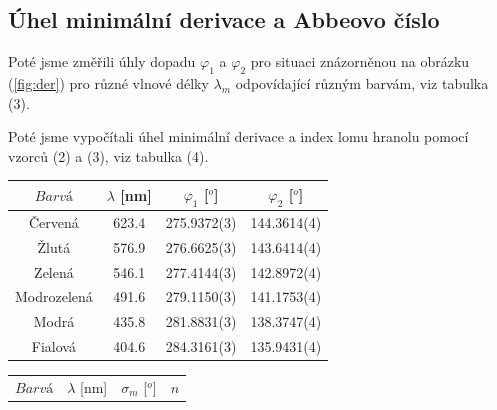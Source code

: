 \documentclass[a4paper,11pt]{article}
\begin{document}
\begin{minipage}[t]{0.5\textwidth}
            \subsection{Úhel minimální derivace a Abbeovo číslo}
                Poté jsme změřili úhly dopadu $\varphi_1$ a $\varphi_2$ pro situaci znázorněnou na obrázku (\ref{fig:der}) pro různé vlnové délky $\lambda_m$ odpovídající různým barvám, viz tabulka (3). 
    \end{minipage}
    \hspace{10pt}
    \begin{minipage}[t]{0.5\textwidth}
                Poté jsme vypočítali úhel minimální derivace a index lomu hranolu pomocí vzorců (2) a (3), viz tabulka (4). 
                \vspace{10pt}
                \par \centering
                \begin{tabular}{|c|c|c|c|}
                    \hline
                    $Barvá$ & $\lambda$ [nm] & $\varphi_1$ [$^o$] & $\varphi_2$ [$^o$] \\
                    \hline
                    Červená & 623.4 & 275.9372(3) & 144.3614(4) \\
                    \hline
                    Žlutá & 576.9 & 276.6625(3) & 143.6414(4) \\
                    \hline
                    Zelená & 546.1 & 277.4144(3) & 142.8972(4) \\
                    \hline
                    Modrozelená & 491.6 & 279.1150(3) & 141.1753(4) \\
                    \hline
                    Modrá & 435.8 & 281.8831(3) & 138.3747(4) \\
                    \hline
                    Fialová & 404.6 & 284.3161(3) & 135.9431(4) \\
                    \hline
                \end{tabular}
                \captionsetup{justification=centering, font=footnotesize}
                \vspace{5pt}
                \raggedright
                \par \centering
                \begin{tabular}{|c|c|c|c|}
                    \hline
                    $Barvá$ & $\lambda$ [nm] & $\sigma_m$ [$^o$] & $n$ \\

\end{tabular}
\end{minipage}
\end{document}
